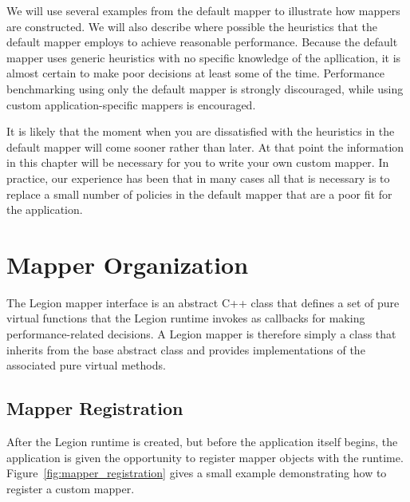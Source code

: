 We will use several examples from the default mapper
to illustrate how mappers are constructed. We will also describe where
possible the heuristics that the default mapper employs to achieve
reasonable performance. Because the default mapper uses generic heuristics
with no specific knowledge of the apllication, it is almost certain to make
poor decisions at least some of the time.
Performance benchmarking using only the default mapper is strongly
discouraged, while using custom application-specific mappers is
encouraged.

It is likely that the moment when you are dissatisfied with the 
heuristics in the default mapper will come sooner rather than later.
At that point the information in this chapter will be necessary for you
to write your own custom mapper.  In practice, our experience has been that in
many cases all that is necessary is to replace a small number of policies in the
default mapper that are a poor fit for the application.

\section{Mapper Organization}
\label{sec:mapping:org}

The Legion mapper interface is an abstract C++ class that defines a set of 
pure virtual functions that the Legion runtime invokes as callbacks
for making performance-related decisions. A Legion mapper is therefore 
simply a class that inherits from the base abstract class and provides 
implementations of the associated pure virtual methods.

\subsection{Mapper Registration}
\label{subsec:mapping:registration}

After the Legion runtime is created, but before the application itself
begins, the application is given the opportunity to register mapper objects 
with the runtime. Figure~\ref{fig:mapper_registration} gives a small
example demonstrating how to register a custom mapper.

